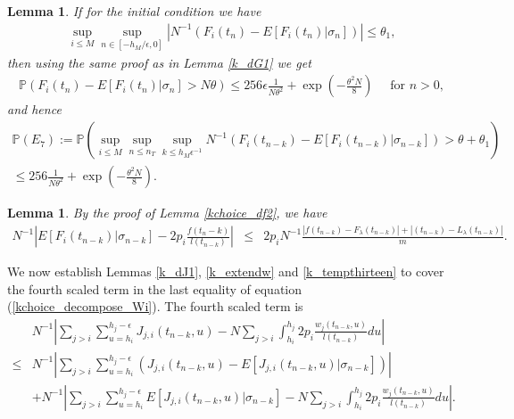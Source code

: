 \documentclass[12pt]{article}
\def\P{\mathbb{P}}
\numberwithin{equation}{section}  %
\newtheorem{lem}[thm]{Lemma}
\begin{document}
\begin{lem}\label{k_dFi1}%
If for the initial condition we have
\begin{align}
\sup_{i\leq M} \sup_{n\in[-h_M/\epsilon,0]} \left| N^{-1} \left(F_i(t_{n})-E[F_i(t_{n})|\sigma_{n}]\right)\right|\leq \theta_1,\label{kchoice_ini_eq7}
\end{align}
then using the same proof as in Lemma \ref{k_dG1} we get
\begin{align*} 
\P(F_i(t_n)-E[F_i(t_n)|\sigma_{n}]> N\theta)\leq 256\epsilon\frac{1}{N\theta^2}+\exp{\left(-\frac{\theta^2 N}{8}\right)} \quad\text{ for }n> 0,
\end{align*} 
and hence 
\begin{align*} 
\P(E_7):=
\P(\sup_{i\leq M} \sup_{n\leq n_T} \sup_{k\leq h_M\epsilon^{-1}} N^{-1} \left(F_i(t_{n-k})-E[F_i(t_{n-k})|\sigma_{n-k}]\right)> \theta+\theta_1)\\
\leq 256\frac{1}{N\theta^2}+\exp{\left(-\frac{\theta^2 N}{8}\right)}.
\end{align*} 
\end{lem}

\begin{lem}\label{k_dFi2}%
By the proof of Lemma \ref{kchoice_df2}, we have
{\footnotesize
\begin{align*} 
N^{-1}\left|
E[F_i(t_{n-k})|\sigma_{n-k}]-2p_i\frac{f(t_n-k)}{l(t_{n-k})}
\right|&\leq& 2p_i  N^{-1} \frac{|f(t_{n-k})-F_\lambda(t_{n-k})|+  |(t_{n-k})-L_\lambda(t_{n-k})|}{m}.
\end{align*} }
\end{lem}

We now establish Lemmas \ref{k_dJ1}, \ref{k_extendw} and \ref{k_tempthirteen} to cover the fourth scaled term in the last equality of equation (\ref{kchoice_decompose_Wi}). The fourth scaled term is
\begin{align}
 &N^{-1}\left|
\sum_{j>i} \sum_{u=h_i}^{h_j-\epsilon}J_{j,i}(t_{n-k},u)-N
\sum_{j>i} \int_{h_i}^{h_j}2p_i\frac{w_j(t_{n-k},u)}{l(t_{n-k})}du
\right|\nonumber\\
\leq& N^{-1}\left|
\sum_{j>i} \sum_{u=h_i}^{h_j-\epsilon}\left(
 J_{j,i}(t_{n-k},u)-E[J_{j,i}(t_{n-k},u)|\sigma_{n-k}]
 \right)\right|\nonumber\\
 &+N^{-1}\left|\sum_{j>i} 
 \sum_{u=h_i}^{h_j-\epsilon} E[J_{j,i}(t_{n-k},u)|\sigma_{n-k}]-N
\sum_{j>i} \int_{h_i}^{h_j}2p_i\frac{w_j(t_{n-k},u)}{l(t_{n-k})}du
\right|.\label{k_lastterm_induction_eq0}
\end{align}
\end{document}
